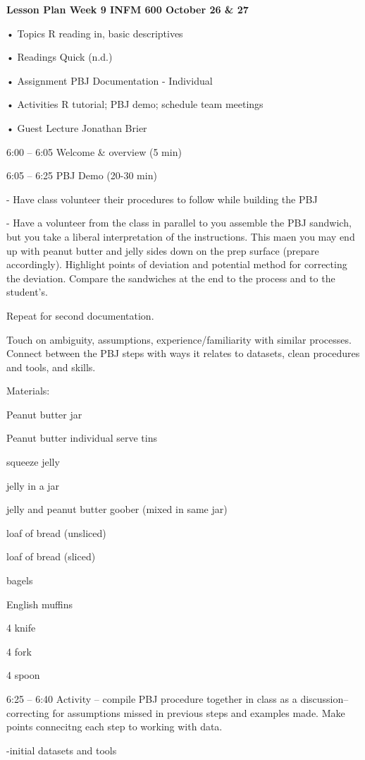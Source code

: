 \documentclass[]{article}
\date{}
\begin{document}
\textbf{Lesson Plan Week 9 INFM 600 October 26 \& 27 }

• Topics R reading in, basic descriptives

• Readings Quick (n.d.)

• Assignment PBJ Documentation - Individual

• Activities R tutorial; PBJ demo; schedule team meetings

• Guest Lecture Jonathan Brier

6:00 -- 6:05 Welcome \& overview (5 min)

6:05 -- 6:25 PBJ Demo (20-30 min)

- Have class volunteer their procedures to follow while building the PBJ

- Have a volunteer from the class in parallel to you assemble the PBJ
sandwich, but you take a liberal interpretation of the instructions.
This maen you may end up with peanut butter and jelly sides down on the
prep surface (prepare accordingly). Highlight points of deviation and
potential method for correcting the deviation. Compare the sandwiches at
the end to the process and to the student's.

Repeat for second documentation.

Touch on ambiguity, assumptions, experience/familiarity with similar
processes. Connect between the PBJ steps with ways it relates to
datasets, clean procedures and tools, and skills.

Materials:

Peanut butter jar

Peanut butter individual serve tins

squeeze jelly

jelly in a jar

jelly and peanut butter goober (mixed in same jar)

loaf of bread (unsliced)

loaf of bread (sliced)

bagels

English muffins

4 knife

4 fork

4 spoon

6:25 -- 6:40 Activity -- compile PBJ procedure together in class as a
discussion-- correcting for assumptions missed in previous steps and
examples made. Make points connecitng each step to working with data.

-initial datasets and tools
\end{document}
